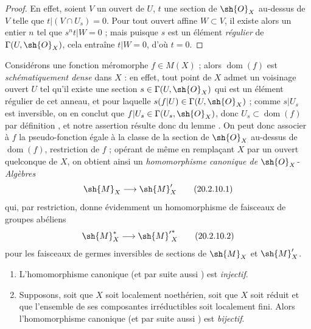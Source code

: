 \begin{proof}
En effet, soient $V$ un ouvert de $U$, $t$ une section de $\sh{O}_X$ au-dessus de $V$ telle que $t|(V\cap U_s)=0$.
Pour tout ouvert affine $W\subset V$, il existe alors un entier $n$ tel que $s^nt|W=0$  ; mais puisque $s$ est un élément \emph{régulier} de $\Gamma(U,\sh{O}_X)$, cela entraîne $t|W=0$, d'où $t=0$.
\end{proof}

\begin{env}[20.2.10]
\label{IV.20.2.10}
Considérons une fonction méromorphe $f\in M(X)$  ; alors $\operatorname{dom}(f)$ est \emph{schématiquement dense} dans $X$ : en effet, tout point de $X$ admet un voisinage ouvert $U$ tel qu'il existe une section $s\in\Gamma(U,\sh{O}_X)$ qui est un élément régulier de cet anneau, et pour laquelle $s(f|U)\in\Gamma(U,\sh{O}_X)$ ; comme $s|U_s$ est inversible, on en conclut que $f|U_s\in\Gamma(U_s,\sh{O}_X)$, donc $U_s\subset\operatorname{dom}(f)$ par définition , et notre assertion résulte donc du lemme .
On peut donc associer à $f$ la pseudo-fonction égale à la classe de la section de $\sh{O}_X$ au-dessus de $\operatorname{dom}(f)$, restriction de $f$ ; opérant de même en remplaçant $X$ par un ouvert quelconque de $X$, on obtient ainsi un \emph{homomorphisme canonique de $\sh{O}_X$-Algèbres}
\[
\label{IV.20.2.10.1}
  \sh{M}_X\to\sh{M}'_X
  \tag{20.2.10.1}
\]
qui, par restriction, donne évidemment un homomorphisme de faisceaux de groupes abéliens
\[
\label{IV.20.2.10.2}
  \sh{M}_X^*\to{\sh{M}'}^*_X
  \tag{20.2.10.2}
\]
pour les faisceaux de germes inversibles de sections de $\sh{M}_X$ et $\sh{M}'_X$.
\end{env}

\begin{proposition}[20.2.11]
\label{IV.20.2.11}
\medskip
\begin{enumerate}[label=\emph{(\roman*)}]
  \item L'homomorphisme canonique \emph{} (et par suite aussi \emph{}) est \emph{injectif}.
  \item Supposons, soit que $X$ soit localement noethérien, soit que $X$ soit réduit et que l'ensemble de ses composantes irréductibles soit localement fini.
  Alors l'homomorphisme canonique \emph{} (et par suite aussi \emph{}) est \emph{bijectif}.
\end{enumerate}
\end{proposition}

